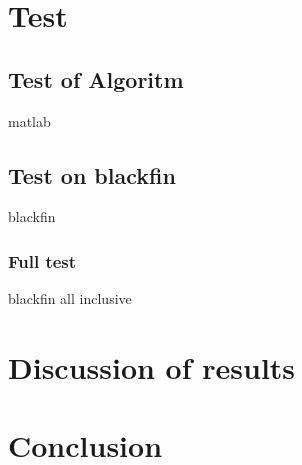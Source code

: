 \chapter{Test}
\section{Test of Algoritm}
matlab

\section{Test on blackfin}
blackfin

\subsection{Full test}
blackfin all inclusive

\chapter{Discussion of results}

\chapter{Conclusion}